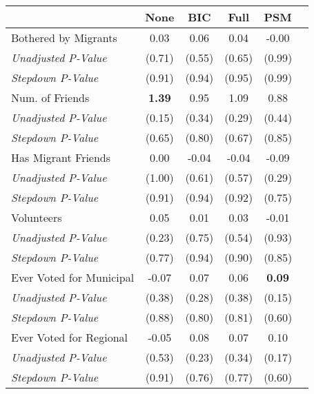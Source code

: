 \begin{tabular}{l c c c c c}
\toprule
 & None & BIC & Full & PSM \\
\midrule
Bothered by Migrants & 0.03 & 0.06 & 0.04 & -0.00 \\
\quad \textit{Unadjusted P-Value} & (0.71) & (0.55) & (0.65) & (0.99) \\
\quad \textit{Stepdown P-Value} & (0.91) & (0.94) & (0.95) & (0.99) \\
Num. of Friends & \textbf{ 1.39 } & 0.95 & 1.09 & 0.88 \\
\quad \textit{Unadjusted P-Value} & (0.15) & (0.34) & (0.29) & (0.44) \\
\quad \textit{Stepdown P-Value} & (0.65) & (0.80) & (0.67) & (0.85) \\
Has Migrant Friends & 0.00 & -0.04 & -0.04 & -0.09 \\
\quad \textit{Unadjusted P-Value} & (1.00) & (0.61) & (0.57) & (0.29) \\
\quad \textit{Stepdown P-Value} & (0.91) & (0.94) & (0.92) & (0.75) \\
Volunteers & 0.05 & 0.01 & 0.03 & -0.01 \\
\quad \textit{Unadjusted P-Value} & (0.23) & (0.75) & (0.54) & (0.93) \\
\quad \textit{Stepdown P-Value} & (0.77) & (0.94) & (0.90) & (0.85) \\
Ever Voted for Municipal & -0.07 & 0.07 & 0.06 & \textbf{ 0.09 } \\
\quad \textit{Unadjusted P-Value} & (0.38) & (0.28) & (0.38) & (0.15) \\
\quad \textit{Stepdown P-Value} & (0.88) & (0.80) & (0.81) & (0.60) \\
Ever Voted for Regional & -0.05 & 0.08 & 0.07 & 0.10 \\
\quad \textit{Unadjusted P-Value} & (0.53) & (0.23) & (0.34) & (0.17) \\
\quad \textit{Stepdown P-Value} & (0.91) & (0.76) & (0.77) & (0.60) \\
\bottomrule
\end{tabular}
